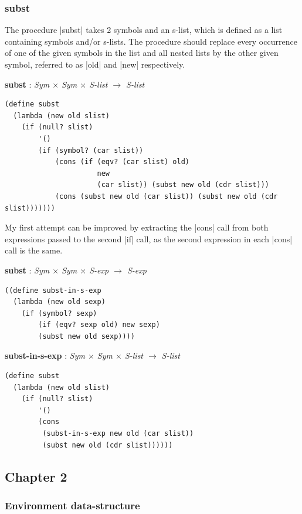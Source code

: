 \documentclass[a4paper]{article}
\begin{document}
\subsubsection{subst}

The procedure |subst| takes 2 symbols and an s-list, which is defined as a list containing symbols and/or s-lists. The procedure should replace every occurrence of one of the given symbols in the list and all nested lists by the other given symbol, referred to as |old| and |new| respectively.


\textbf{subst} : \textit{Sym $\times$ Sym $\times$ S-list $\rightarrow$ S-list}
\begin{lstlisting}[aboveskip=0pt]
(define subst
  (lambda (new old slist)
    (if (null? slist)
        '()
        (if (symbol? (car slist))
            (cons (if (eqv? (car slist) old)
                      new
                      (car slist)) (subst new old (cdr slist)))
            (cons (subst new old (car slist)) (subst new old (cdr slist)))))))
\end{lstlisting}

My first attempt can be improved by extracting the |cons| call from both expressions passed to the second |if| call, as the second expression in each |cons| call is the same.


\textbf{subst} : \textit{Sym $\times$ Sym $\times$ S-exp $\rightarrow$ S-exp}
\begin{lstlisting}[aboveskip=0pt]
((define subst-in-s-exp
  (lambda (new old sexp)
    (if (symbol? sexp)
        (if (eqv? sexp old) new sexp)
        (subst new old sexp))))
\end{lstlisting}

\textbf{subst-in-s-exp} : \textit{Sym $\times$ Sym $\times$ S-list $\rightarrow$ S-list}
\begin{lstlisting}[aboveskip=0pt]
(define subst
  (lambda (new old slist)
    (if (null? slist)
        '()
        (cons
         (subst-in-s-exp new old (car slist))
         (subst new old (cdr slist))))))
\end{lstlisting}

\newpage

\subsection{Chapter 2}

\subsubsection{Environment data-structure}
\label{sec:env}
\end{document}
